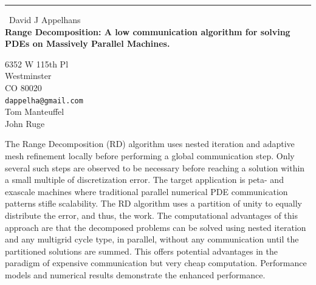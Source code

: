 \documentclass{report}
\begin{document}
\begin{center}
\rule{6in}{1pt} \
{\large David J Appelhans \\
{\bf Range Decomposition: A low communication algorithm for solving PDEs on Massively Parallel Machines.}}

6352 W 115th Pl \\ Westminster \\ CO 80020
\\
{\tt dappelha@gmail.com}\\
Tom Manteuffel\\
John Ruge\end{center}

The Range Decomposition (RD) algorithm uses nested iteration and adaptive
mesh refinement locally before performing a global communication step.
Only several such steps are observed to be necessary before reaching a
solution within a small multiple of discretization error. The target
application is peta- and exascale machines where traditional parallel
numerical PDE communication patterns stifle scalability. The RD algorithm
uses a partition of unity to equally distribute the error, and thus, the
work. The computational advantages of this approach are that the
decomposed problems can be solved using nested iteration and any
multigrid cycle type, in parallel, without any communication until the
partitioned solutions are summed. This offers potential advantages in the
paradigm of expensive communication but very cheap computation.
Performance models and numerical results demonstrate the enhanced
performance.
\end{document}
